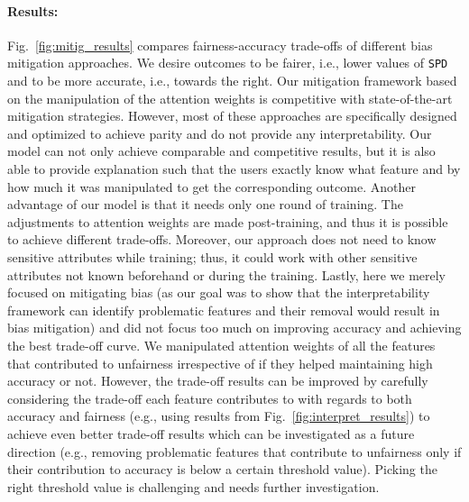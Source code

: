 \paragraph{Results:}
Fig.~\ref{fig:mitig_results} compares fairness-accuracy trade-offs of different bias mitigation approaches. We desire outcomes to be fairer, i.e., lower values of \texttt{SPD} and to be more accurate, i.e., towards the right. 
Our mitigation framework based on the manipulation of the attention weights is competitive with state-of-the-art mitigation strategies. However, most of these approaches are  specifically designed and optimized to achieve parity and do not provide any interpretability. 
Our model can not only achieve comparable and competitive results, but it is also able to provide explanation such that the users exactly know what feature and by how much it was manipulated to get the corresponding outcome. Another advantage of our model is that it needs only one round of training. The adjustments to attention weights are made post-training, and thus it is possible to achieve different trade-offs. Moreover, our approach does not need to know sensitive attributes while training; thus, it could work with other sensitive attributes not known beforehand or during the training.  Lastly, here we merely focused on mitigating bias (as our goal was to show that the interpretability framework can identify problematic features and their removal would result in bias mitigation) and did not focus too much on improving accuracy and achieving the best trade-off curve. We manipulated attention weights of all the features that contributed to unfairness irrespective of if they helped maintaining high accuracy or not. However, the trade-off results can be improved by carefully considering the trade-off each feature contributes to with regards to both accuracy and fairness (e.g., using results from Fig.~\ref{fig:interpret_results}) to achieve even  better trade-off results which can be investigated as a future direction (e.g., removing problematic features that contribute to unfairness only if their contribution to accuracy is below a certain threshold value). Picking the right threshold value is challenging and needs further investigation.






